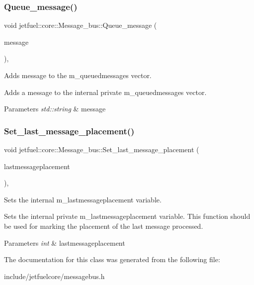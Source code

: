 \subsubsection{\texorpdfstring{Queue\+\_\+message()}{Queue\_message()}}
{\footnotesize\ttfamily void jetfuel\+::core\+::\+Message\+\_\+bus\+::\+Queue\+\_\+message (\begin{DoxyParamCaption}\item[{const std\+::string}]{message }\end{DoxyParamCaption})\hspace{0.3cm}{\ttfamily [inline]}, {\ttfamily [protected]}}



Adds message to the m\+\_\+queuedmessages vector. 

Adds a message to the internal private m\+\_\+queuedmessages vector.


\begin{DoxyParams}{Parameters}
{\em std\+::string} & message \\
\hline
\end{DoxyParams}
\mbox{\label{classjetfuel_1_1core_1_1Message__bus_a12c40043878677d0dbb5e9897f48d08f}} 
\subsubsection{\texorpdfstring{Set\+\_\+last\+\_\+message\+\_\+placement()}{Set\_last\_message\_placement()}}
{\footnotesize\ttfamily void jetfuel\+::core\+::\+Message\+\_\+bus\+::\+Set\+\_\+last\+\_\+message\+\_\+placement (\begin{DoxyParamCaption}\item[{const int}]{lastmessageplacement }\end{DoxyParamCaption})\hspace{0.3cm}{\ttfamily [inline]}, {\ttfamily [protected]}}



Sets the internal m\+\_\+lastmessageplacement variable. 

Sets the internal private m\+\_\+lastmessageplacement variable. This function should be used for marking the placement of the last message processed.


\begin{DoxyParams}{Parameters}
{\em int} & lastmessageplacement \\
\hline
\end{DoxyParams}


The documentation for this class was generated from the following file\+:\begin{DoxyCompactItemize}
\item 
include/jetfuelcore/messagebus.\+h\end{DoxyCompactItemize}
